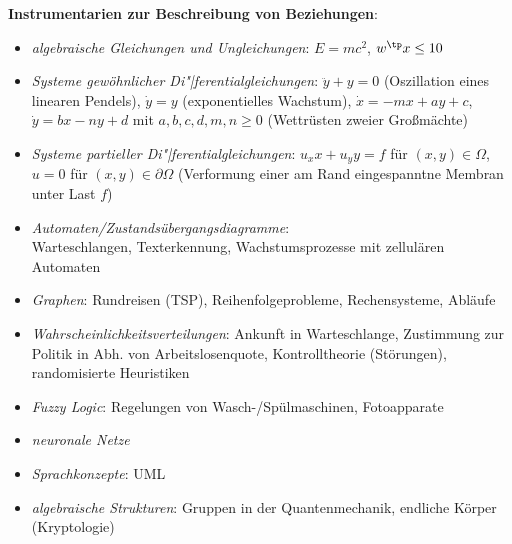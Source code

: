 \textbf{Instrumentarien zur Beschreibung von Beziehungen}:
\begin{itemize}
    \item
    \emph{algebraische Gleichungen und Ungleichungen}:
    $E = mc^2$, $w^\tp x \le 10$
    
    \item
    \emph{Systeme gewöhnlicher Di"|ferentialgleichungen}:
    $\ddot{y} + y = 0$ (Oszillation eines linearen Pendels),
    $\dot{y} = y$ (exponentielles Wachstum),
    $\dot{x} = -mx + ay + c$, $\dot{y} = bx - ny + d$ mit $a, b, c, d, m, n \ge 0$
    (Wettrüsten zweier Großmächte)
    
    \item
    \emph{Systeme partieller Di"|ferentialgleichungen}:
    $u_xx + u_yy = f$ für $(x, y) \in \Omega$, $u = 0$ für $(x, y) \in \partial \Omega$
    (Verformung einer am Rand eingespanntne Membran unter Last $f$)
    
    \item
    \emph{Automaten/Zustandsübergangsdiagramme}:\\
    Warteschlangen,
    Texterkennung,
    Wachstumsprozesse mit zellulären Automaten
    
    \item
    \emph{Graphen}:
    Rundreisen (TSP),
    Reihenfolgeprobleme,
    Rechensysteme,
    Abläufe
    
    \item
    \emph{Wahrscheinlichkeitsverteilungen}:
    Ankunft in Warteschlange,
    Zustimmung zur Politik in Abh. von Arbeitslosenquote,
    Kontrolltheorie (Störungen),
    randomisierte Heuristiken
    
    \item
    \emph{Fuzzy Logic}:
    Regelungen von Wasch-/Spülmaschinen,
    Fotoapparate
    
    \item
    \emph{neuronale Netze}
    
    \item
    \emph{Sprachkonzepte}:
    UML
    
    \item
    \emph{algebraische Strukturen}:
    Gruppen in der Quantenmechanik,
    endliche Körper (Kryptologie)
\end{itemize}

\linie

